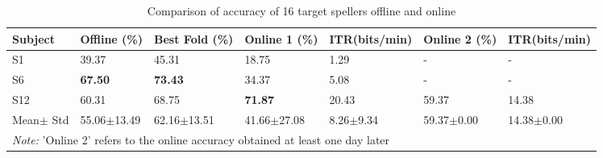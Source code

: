 \begin{table}[h]
\small
\caption{Comparison of accuracy of 16 target spellers offline and online}
\label{tab:sixteen-target-comparison}
\begin{tabular}{@{}p{1.8cm}p{2cm}p{2cm}p{2.2cm}p{2cm}p{2.2cm}p{2cm}@{}}
\toprule
Subject & Offline (\%) & Best Fold (\%) & Online 1 (\%) & ITR(bits/min) & Online 2 (\%) & ITR(bits/min) \\ \midrule
S1      & 39.37        & 45.31          & 18.75         & 1.29             & -             & - \\
S6      & \textbf{67.50}        & \textbf{73.43}          & 34.37         & 5.08             & -             & - \\
S12     & 60.31        & 68.75          & \textbf{71.87}         & 20.43            & 59.37         & 14.38 \\ \bottomrule
Mean$\pm$ Std & 55.06$\pm$13.49 & 62.16$\pm$13.51 & 41.66$\pm$27.08 & 8.26$\pm$9.34 & 59.37$\pm$0.00 & 14.38$\pm$0.00 \\ \bottomrule
\multicolumn{7}{l}{\footnotesize\textit{Note:} 'Online 2' refers to the online accuracy obtained at least one day later}
\end{tabular}
\end{table}



\cite{9618750}
\cite{8104195}
\cite{brennan2015accessing}